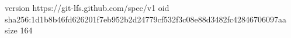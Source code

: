 version https://git-lfs.github.com/spec/v1
oid sha256:1d1b8b46fd626201f7eb952b2d24779cf532f3c08e88d3482fc42846706097aa
size 164
